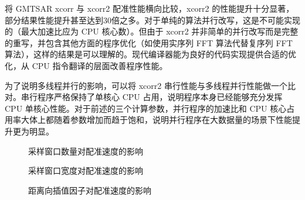 将 GMTSAR xcorr 与 xcorr2 配准性能横向比较，xcorr2 的性能提升十分显著，部分结果性能提升甚至达到30倍之多。对于单纯的算法并行改写，这是不可能实现的（最大加速比应为 CPU 核心数）。但由于 xcorr2 并非简单的并行改写而是完整的重写，并包含其他方面的程序优化（如使用实序列 FFT 算法代替复序列 FFT 算法），这样的结果是可以理解的。现代编译器能为良好的代码实现提供合适的优化，从 CPU 指令翻译的层面改善程序性能。

为了说明多线程并行的影响，可以将 xcorr2 串行性能与多线程并行性能做一个比对。串行程序严格保持了单核心 CPU 占用，说明程序本身已经能够充分发挥 CPU 单核心性能。对于前述的三个计算参数，并行程序的加速比和 CPU 核心占用率大体上都随着参数增加而趋于饱和，说明并行程序在大数据量的场景下性能提升更为明显。

\begin{figure}[htbp]
\centering
\subfloat[程序计算时间]{
    \label{fig:exp_nxy_a}
    \begin{minipage}[t]{0.49\textwidth}
        \centering
        \resizebox {\textwidth} {!} {
            
        }
    \end{minipage}
}
\caption{采样窗口数量对配准速度的影响} \label{fig:exp_nxy}
\end{figure}

\begin{figure}[htbp]
\centering
\subfloat[程序计算时间]{
    \label{fig:exp_xsys_a}
    \begin{minipage}[t]{0.49\textwidth}
        \centering
        \resizebox {\textwidth} {!} {
            
        }
    \end{minipage}
}
\caption{采样窗口宽度对配准速度的影响} \label{fig:exp_xsys}
\end{figure}

\begin{figure}[htbp]
\centering
\subfloat[程序计算时间]{
    \label{fig:exp_ri_a}
    \begin{minipage}[t]{0.49\textwidth}
        \centering
        \resizebox {\textwidth} {!} {
            
        }
    \end{minipage}
}
\caption{距离向插值因子对配准速度的影响} \label{fig:exp_ri}
\end{figure}

